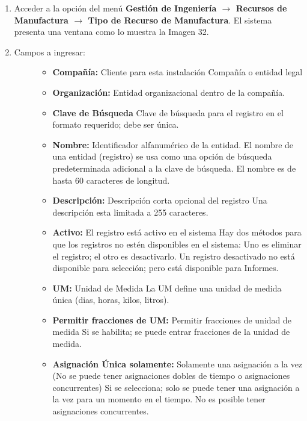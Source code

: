 \documentclass[letterpaper,10pt,spanish]{sphinxmanual}
\begin{document}
\begin{enumerate}
\item {} 
Acceder a la opción del menú \textbf{Gestión de Ingeniería \(\rightarrow\)  Recursos de Manufactura \(\rightarrow\) Tipo de Recurso de Manufactura}. El sistema presenta una ventana como lo muestra la Imagen 32.

\item {} \begin{description}
\item[{Campos a ingresar:}] \leavevmode\begin{itemize}
\item {} 
\textbf{Compañía:} Cliente para esta instalación Compañía o entidad legal

\item {} 
\textbf{Organización:} Entidad organizacional dentro de la compañía.

\item {} 
\textbf{Clave de Búsqueda} Clave de búsqueda para el registro en el formato requerido; debe ser única.

\item {} 
\textbf{Nombre:} Identificador alfanumérico de la entidad. El nombre de una entidad (registro) se usa como una opción de búsqueda predeterminada adicional a la clave de búsqueda. El nombre es de hasta 60 caracteres de longitud.

\item {} 
\textbf{Descripción:} Descripción corta opcional del registro Una descripción esta limitada a 255 caracteres.

\item {} 
\textbf{Activo:} El registro está activo en el sistema Hay dos métodos para que los registros no estén disponibles en el sistema: Uno es eliminar el registro; el otro es desactivarlo. Un registro desactivado no está disponible para selección; pero está disponible para Informes.

\item {} 
\textbf{UM:} Unidad de Medida La UM define una unidad de medida única (dias, horas, kilos, litros).

\item {} 
\textbf{Permitir fracciones de UM:} Permitir fracciones de unidad de medida Si se habilita; se puede entrar fracciones de la unidad de medida.

\item {} 
\textbf{Asignación Única solamente:} Solamente una asignación a la vez (No se puede tener asignaciones dobles de tiempo o asignaciones concurrentes) Si se selecciona; solo se puede tener una asignación a la vez para un momento en el tiempo. No es posible tener asignaciones concurrentes.


\end{itemize}
\end{description}
\end{enumerate}
\end{document}
